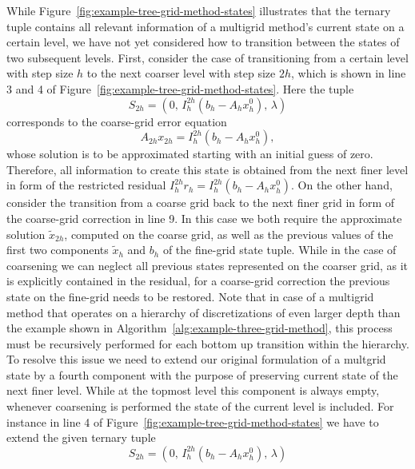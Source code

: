 While Figure~\ref{fig:example-tree-grid-method-states} illustrates that the ternary tuple contains all relevant information of a multigrid method's current state on a certain level, we have not yet considered how to transition between the states of two subsequent levels.
First, consider the case of transitioning from a certain level with step size $h$ to the next coarser level with step size $2h$, which is shown in line 3 and 4 of Figure~\ref{fig:example-tree-grid-method-states}.
Here the tuple
\begin{equation*}
	S_{2h} = (0, \, I_{h}^{2h}(b_{h} - A_h x_{h}^0), \, \lambda)
\end{equation*} 
corresponds to the coarse-grid error equation 
\begin{equation*}
	A_{2h} x_{2h} = I_{h}^{2h}(b_{h} - A_h x_{h}^0),
\end{equation*}
whose solution is to be approximated starting with an initial guess of zero.
Therefore, all information to create this state is obtained from the next finer level in form of the restricted residual $I_h^{2h} r_h = I_h^{2h} (b_{h} - A_h x_{h}^0)$.
On the other hand, consider the transition from a coarse grid back to the next finer grid in form of the coarse-grid correction in line 9.
In this case we both require the approximate solution $\tilde{x}_{2h}$, computed on the coarse grid, as well as the previous values of the first two components $\tilde{x}_h$ and $b_h$ of the fine-grid state tuple.
While in the case of coarsening we can neglect all previous states represented on the coarser grid, as it is explicitly contained in the residual, for a coarse-grid correction the previous state on the fine-grid needs to be restored.
Note that in case of a multigrid method that operates on a hierarchy of discretizations of even larger depth than the example shown in Algorithm~\ref{alg:example-three-grid-method}, this process must be recursively performed for each bottom up transition within the hierarchy.
To resolve this issue we need to extend our original formulation of a multgrid state by a fourth component with the purpose of preserving current state of the next finer level.
While at the topmost level this component is always empty, whenever coarsening is performed the state of the current level is included.
For instance in line 4 of Figure~\ref{fig:example-tree-grid-method-states} we have to extend the given ternary tuple 
\begin{equation*}
S_{2h} = (0, \, I_{h}^{2h}(b_{h} - A_h x_{h}^0), \, \lambda)
\end{equation*}
